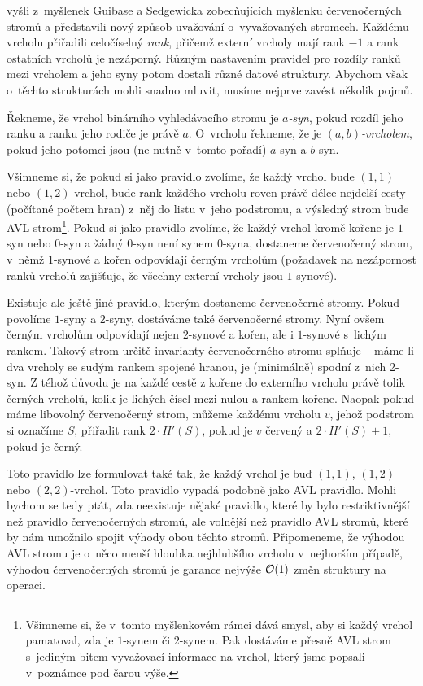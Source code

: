 \citet{rankbalanced} vyšli z~myšlenek Guibase a Sedgewicka \citeyearpar{redblack} zobecňujících
myšlenku červenočerných stromů a představili nový způsob uvažování
o~vyvažovaných stromech. Každému vrcholu přiřadili celočíselný \emph{rank}, přičemž
externí vrcholy mají rank $-1$ a rank ostatních vrcholů je nezáporný. Různým
nastavením pravidel pro rozdíly ranků mezi vrcholem a jeho syny potom dostali
různé datové struktury. Abychom však o~těchto strukturách mohli snadno mluvit,
musíme nejprve zavést několik pojmů.

\begin{definice}
Řekneme, že vrchol binárního vyhledávacího stromu je \emph{$a$-syn}, pokud rozdíl jeho ranku a ranku jeho rodiče je právě $a$. O~vrcholu řekneme, že je \emph{$(a,b)$-vrcholem}, pokud jeho potomci jsou (ne nutně v~tomto pořadí) $a$-syn a $b$-syn.
\end{definice}

Všimneme si, že pokud si jako pravidlo zvolíme, že každý vrchol bude $(1,1)$
nebo $(1,2)$-vrchol, bude rank každého vrcholu roven právě délce nejdelší cesty
(počítané počtem hran) z~něj do listu v~jeho podstromu, a výsledný strom bude
AVL strom\footnote{Všimneme si, že v~tomto myšlenkovém rámci dává smysl, aby si každý vrchol pamatoval, zda je $1$-synem či $2$-synem. Pak dostáváme přesně AVL strom s~jediným bitem vyvažovací informace na vrchol, který jsme popsali v~poznámce pod čarou výše.}. Pokud si jako pravidlo zvolíme, že každý vrchol kromě kořene je
$1$-syn nebo $0$-syn a žádný $0$-syn není synem $0$-syna, dostaneme
červenočerný strom, v~němž $1$-synové a kořen odpovídají černým vrcholům (požadavek na
nezápornost ranků vrcholů zajišťuje, že všechny externí vrcholy jsou
$1$-synové).

Existuje ale ještě jiné pravidlo, kterým dostaneme červenočerné stromy. Pokud
povolíme $1$-syny a $2$-syny, dostáváme také červenočerné stromy. Nyní ovšem
černým vrcholům odpovídají nejen $2$-synové a kořen, ale i $1$-synové s~lichým rankem.
Takový strom určitě invarianty červenočerného stromu splňuje -- máme-li dva
vrcholy se sudým rankem spojené hranou, je (minimálně) spodní z~nich 2-syn. Z téhož důvodu je na každé cestě z kořene do externího vrcholu právě tolik černých vrcholů, kolik je lichých čísel mezi nulou a rankem kořene. 
Naopak pokud máme libovolný červenočerný strom, můžeme každému vrcholu $v$, jehož
podstrom si označíme $S$, přiřadit rank $2\cdot H'(S)$, pokud je $v$ červený a
$2\cdot H'(S) + 1$, pokud je černý.

Toto pravidlo lze formulovat také tak, že každý vrchol je buď $(1,1)$, $(1,2)$ nebo $(2,2)$-vrchol. Toto pravidlo vypadá podobně jako AVL pravidlo. Mohli bychom se tedy ptát, zda neexistuje nějaké pravidlo, které by bylo restriktivnější než pravidlo červenočerných stromů, ale volnější než pravidlo AVL stromů, které by nám umožnilo spojit výhody obou těchto stromů. Připomeneme, že výhodou AVL stromu je o~něco menší hloubka nejhlubšího vrcholu v~nejhorším případě, výhodou červenočerných stromů je garance nejvýše $\mathcal O(1)$ změn struktury na operaci. 

